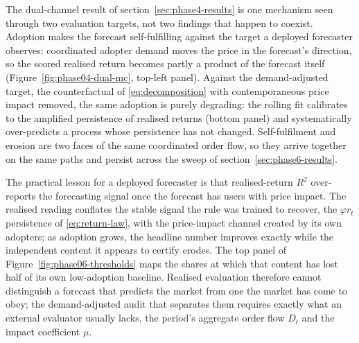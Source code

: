\documentclass[12pt]{article}
\begin{document}
The dual-channel result of section~\ref{sec:phase4-results} is one mechanism seen through two evaluation targets, not two findings that happen to coexist. Adoption makes the forecast self-fulfilling against the target a deployed forecaster observes: coordinated adopter demand moves the price in the forecast's direction, so the scored realised return becomes partly a product of the forecast itself (Figure~\ref{fig:phase04-dual-mc}, top-left panel). %
Against the demand-adjusted target, the counterfactual of \eqref{eq:decomposition} with contemporaneous price impact removed, the same adoption is purely degrading: the rolling fit calibrates to the amplified persistence of realised returns (bottom panel) and systematically over-predicts a process whose persistence has not changed. %
Self-fulfilment and erosion are two faces of the same coordinated order flow, so they arrive together on the same paths and persist across the sweep of section~\ref{sec:phase6-results}.

The practical lesson for a deployed forecaster is that realised-return $R^{2}$ over-reports the forecasting signal once the forecast has users with price impact. The realised reading conflates the stable signal the rule was trained to recover, the $\varphi r_t$ persistence of \eqref{eq:return-law}, with the price-impact channel created by its own adopters; as adoption grows, the headline number improves exactly while the independent content it appears to certify erodes. The top panel of Figure~\ref{fig:phase06-thresholds} maps the shares at which that content has lost half of its own low-adoption baseline. %
Realised evaluation therefore cannot distinguish a forecast that predicts the market from one the market has come to obey; the demand-adjusted audit that separates them requires exactly what an external evaluator usually lacks, the period's aggregate order flow $D_t$ and the impact coefficient $\mu$. %
\end{document}
